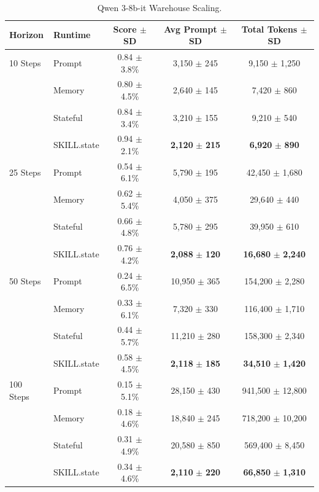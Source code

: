 \documentclass[11pt]{article}
\begin{document}
\begin{table}[t]
\centering
\caption{Qwen 3-8b-it Warehouse Scaling.}
\label{tab:env1_exp1_qwen3_8b}
\begin{tabular}{llccc}
\toprule
\textbf{Horizon} & \textbf{Runtime} & \textbf{Score $\pm$ SD} & \textbf{Avg Prompt $\pm$ SD} & \textbf{Total Tokens $\pm$ SD} \\
\midrule
10 Steps & Prompt & 0.84 $\pm$ 3.8\% & 3,150 $\pm$ 245 & 9,150 $\pm$ 1,250 \\
& Memory & 0.80 $\pm$ 4.5\% & 2,640 $\pm$ 145 & 7,420 $\pm$ 860 \\
& Stateful & 0.84 $\pm$ 3.4\% & 3,210 $\pm$ 155 & 9,210 $\pm$ 540 \\
& SKILL.state & 0.94 $\pm$ 2.1\% & \textbf{2,120} $\pm$ \textbf{215} & \textbf{6,920} $\pm$ \textbf{890} \\
\midrule
25 Steps & Prompt & 0.54 $\pm$ 6.1\% & 5,790 $\pm$ 195 & 42,450 $\pm$ 1,680 \\
& Memory & 0.62 $\pm$ 5.4\% & 4,050 $\pm$ 375 & 29,640 $\pm$ 440 \\
& Stateful & 0.66 $\pm$ 4.8\% & 5,780 $\pm$ 295 & 39,950 $\pm$ 610 \\
& SKILL.state & 0.76 $\pm$ 4.2\% & \textbf{2,088} $\pm$ \textbf{120} & \textbf{16,680} $\pm$ \textbf{2,240} \\
\midrule
50 Steps & Prompt & 0.24 $\pm$ 6.5\% & 10,950 $\pm$ 365 & 154,200 $\pm$ 2,280 \\
& Memory & 0.33 $\pm$ 6.1\% & 7,320 $\pm$ 330 & 116,400 $\pm$ 1,710 \\
& Stateful & 0.44 $\pm$ 5.7\% & 11,210 $\pm$ 280 & 158,300 $\pm$ 2,340 \\
& SKILL.state & 0.58 $\pm$ 4.5\% & \textbf{2,118} $\pm$ \textbf{185} & \textbf{34,510} $\pm$ \textbf{1,420} \\
\midrule
100 Steps & Prompt & 0.15 $\pm$ 5.1\% & 28,150 $\pm$ 430 & 941,500 $\pm$ 12,800 \\
& Memory & 0.18 $\pm$ 4.6\% & 18,840 $\pm$ 245 & 718,200 $\pm$ 10,200 \\
& Stateful & 0.31 $\pm$ 4.9\% & 20,580 $\pm$ 850 & 569,400 $\pm$ 8,450 \\
& SKILL.state & 0.34 $\pm$ 4.6\% & \textbf{2,110} $\pm$ \textbf{220} & \textbf{66,850} $\pm$ \textbf{1,310} \\
\bottomrule
\end{tabular}
\end{table}
\end{document}
